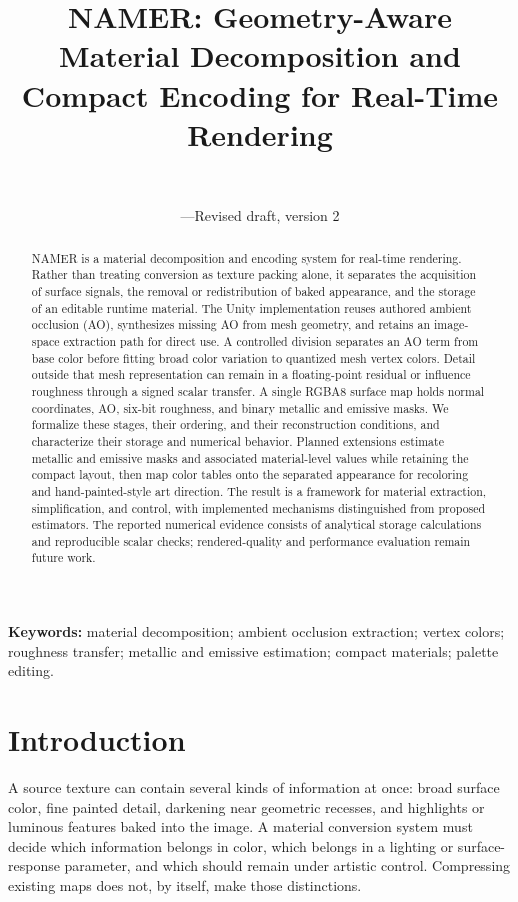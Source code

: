 \documentclass[11pt,letterpaper]{article}
\title{\vspace{-1.5em}\textbf{NAMER: Geometry-Aware Material Decomposition and Compact Encoding for Real-Time Rendering}}
\author{\paperauthor\\[3pt]\small\paperaffiliation}
\date{\small\paperdate\quad---\quad Revised draft, version 2}
\begin{document}
\maketitle
\thispagestyle{plain}

\begin{abstract}
NAMER is a material decomposition and encoding system for real-time rendering. Rather than treating conversion as texture packing alone, it separates the acquisition of surface signals, the removal or redistribution of baked appearance, and the storage of an editable runtime material. The Unity implementation reuses authored ambient occlusion (AO), synthesizes missing AO from mesh geometry, and retains an image-space extraction path for direct use. A controlled division separates an AO term from base color before fitting broad color variation to quantized mesh vertex colors. Detail outside that mesh representation can remain in a floating-point residual or influence roughness through a signed scalar transfer. A single RGBA8 surface map holds normal coordinates, AO, six-bit roughness, and binary metallic and emissive masks. We formalize these stages, their ordering, and their reconstruction conditions, and characterize their storage and numerical behavior. Planned extensions estimate metallic and emissive masks and associated material-level values while retaining the compact layout, then map color tables onto the separated appearance for recoloring and hand-painted-style art direction. The result is a framework for material extraction, simplification, and control, with implemented mechanisms distinguished from proposed estimators. The reported numerical evidence consists of analytical storage calculations and reproducible scalar checks; rendered-quality and performance evaluation remain future work.
\end{abstract}
\vspace{2pt}
\noindent\textbf{Keywords:} material decomposition; ambient occlusion extraction; vertex colors; roughness transfer; metallic and emissive estimation; compact materials; palette editing.

\section{Introduction}
A source texture can contain several kinds of information at once: broad surface color, fine painted detail, darkening near geometric recesses, and highlights or luminous features baked into the image. A material conversion system must decide which information belongs in color, which belongs in a lighting or surface-response parameter, and which should remain under artistic control. Compressing existing maps does not, by itself, make those distinctions.
\end{document}
